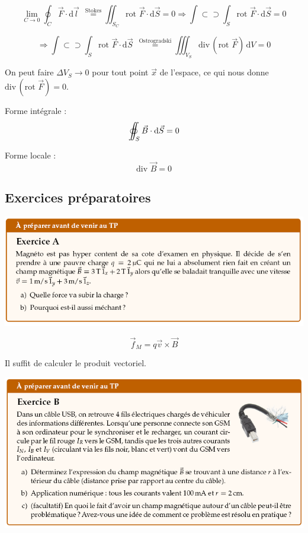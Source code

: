 \documentclass	[11pt, a4paper, openany]{book}
\newcommand{\dif}{\mathrm{d}}
\newcommand{\rot}{\text{rot}\,}
\newcommand{\divv}{\text{div}\,}
\begin{document}
$$\lim_{C\rightarrow0}\oint_C\vec F\cdot\dif\vec l\ \ \overset{\text{Stokes}}{=} \iint_{S_C}\rot\,\vec F\cdot\dif\vec S = 0 \Rightarrow \int\!\!\!\!\!\!\!\subset\!\!\!\supset\!\!\!\!\!\!\!\int_{S}\rot\,\vec F\cdot\dif\vec S = 0 $$

$$ \Rightarrow \int\!\!\!\!\!\!\!\subset\!\!\!\supset\!\!\!\!\!\!\!\int_{S}\rot\,\vec F\cdot\dif\vec S\ \ \overset{\text{Ostrogradski}}{=} \iiint_{V_S} \divv(\rot\,\vec F)\,\dif V = 0 $$

On peut faire $\Delta V_S \rightarrow 0$ pour tout point $\vec x$ de l'espace, ce qui nous donne $\divv(\rot\,\vec F)=0$.


Forme intégrale : $$ \int\!\!\!\!\!\!\!\subset\!\!\!\supset\!\!\!\!\!\!\!\int_{S} \vec B \cdot {\rm d} \vec S = 0$$

Forme locale : $$ \divv\,\vec B = 0$$






	\subsection{Exercices préparatoires}
\begin{center}
\includegraphics[scale=0.85]{prepa/magneto1.png}\\
\end{center}
$$\vec{f}_M = q\vec{v} \times \vec{B}$$
\begin{center}
Il suffit de calculer le produit vectoriel.
\end{center}


\begin{center}
\includegraphics[scale=0.85]{prepa/magneto2.png}\\
\end{center}
\end{document}
